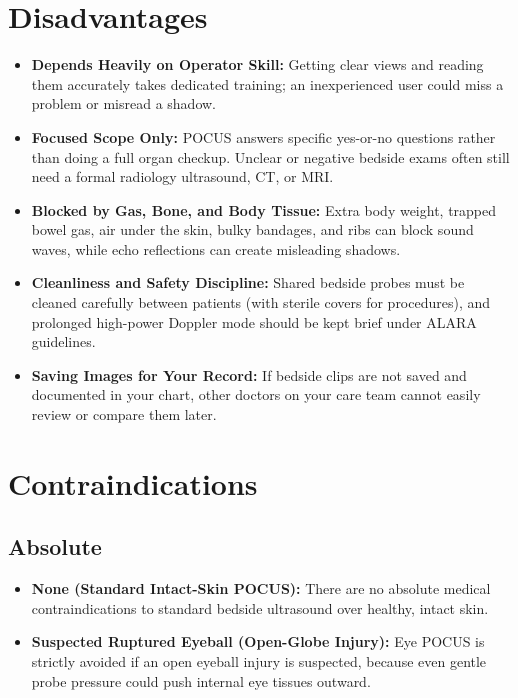 \section{Disadvantages}

\begin{itemize}
    \item \textbf{Depends Heavily on Operator Skill:} Getting clear views and reading them accurately takes dedicated training; an inexperienced user could miss a problem or misread a shadow.
    \item \textbf{Focused Scope Only:} POCUS answers specific yes-or-no questions rather than doing a full organ checkup. Unclear or negative bedside exams often still need a formal radiology ultrasound, CT, or MRI.
    \item \textbf{Blocked by Gas, Bone, and Body Tissue:} Extra body weight, trapped bowel gas, air under the skin, bulky bandages, and ribs can block sound waves, while echo reflections can create misleading shadows.
    \item \textbf{Cleanliness and Safety Discipline:} Shared bedside probes must be cleaned carefully between patients (with sterile covers for procedures), and prolonged high-power Doppler mode should be kept brief under ALARA guidelines.
    \item \textbf{Saving Images for Your Record:} If bedside clips are not saved and documented in your chart, other doctors on your care team cannot easily review or compare them later.
\end{itemize}

\section{Contraindications}

\subsection{Absolute}

\begin{itemize}
    \item \textbf{None (Standard Intact-Skin POCUS):} There are no absolute medical contraindications to standard bedside ultrasound over healthy, intact skin.
    \item \textbf{Suspected Ruptured Eyeball (Open-Globe Injury):} Eye POCUS is strictly avoided if an open eyeball injury is suspected, because even gentle probe pressure could push internal eye tissues outward.
\end{itemize}

